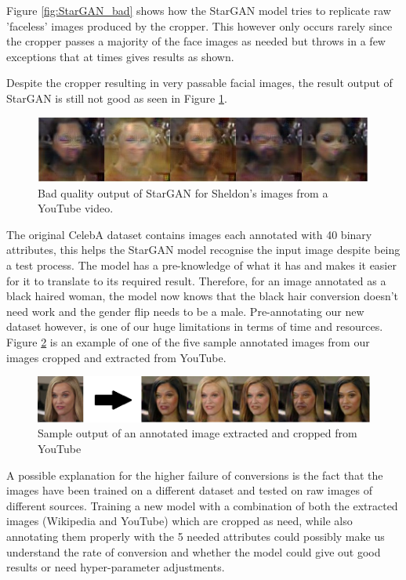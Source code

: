\documentclass[preprint,12pt]{elsarticle}
\begin{document}
Figure \ref{fig:StarGAN_bad} shows how the StarGAN model tries to replicate raw 'faceless' images produced by the cropper. This however only occurs rarely since the cropper passes a majority of the face images as needed but throws in a few exceptions that at times gives results as shown.

Despite the cropper resulting in very passable facial images, the result output of StarGAN is still not good as seen in Figure \ref{fig:StarGAN_yt}.

\begin{figure}[ht]
\centering\includegraphics[width=0.7\linewidth]{preety_bad.jpg}
\caption{Bad quality output of StarGAN for Sheldon's images from a YouTube video.}
\label{fig:StarGAN_yt}
\end{figure}

The original CelebA dataset contains images each annotated with 40 binary attributes, this helps the StarGAN model recognise the input image despite being a test process. The model has a pre-knowledge of what it has and makes it easier for it to translate to its required result. Therefore, for an image annotated as a black haired woman, the model now knows that the black hair conversion doesn't need work and the gender flip needs to be a male. Pre-annotating our new dataset however, is one of our huge limitations in terms of time and resources. Figure \ref{fig:StarGAN_tagged} is an example of one of the five sample annotated images from our images cropped and extracted from YouTube.

\begin{figure}[ht]
\centering\includegraphics[width=0.7\linewidth]{StarGAN_tagged.png}
\caption{Sample output of an annotated image extracted and cropped from YouTube}
\label{fig:StarGAN_tagged}
\end{figure}

A possible explanation for the higher failure of conversions is the fact that the images have been trained on a different dataset and tested on raw images of different sources. Training a new model with a combination of both the extracted images (Wikipedia and YouTube) which are cropped as need, while also annotating them properly with the 5 needed attributes could possibly make us understand the rate of conversion and whether the model could give out good results or need hyper-parameter adjustments.
\end{document}

